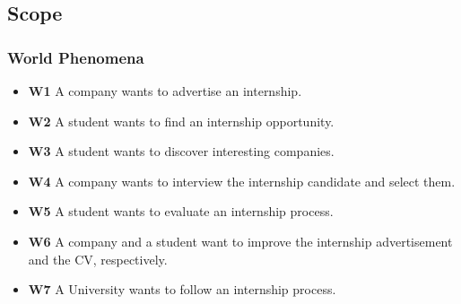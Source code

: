 \documentclass{article}
\begin{document}
\subsection{Scope}
\subsubsection{World Phenomena}
    \begin{itemize}
        \item \textbf{W1} A company wants to advertise an internship. 
        \item \textbf{W2} A student wants to find an internship opportunity.
        \item \textbf{W3} A student wants to discover interesting companies.
        \item \textbf{W4} A company wants to interview the internship candidate and select them.
        \item \textbf{W5} A student wants to evaluate an internship process.
        \item \textbf{W6} A company and a student want to improve the internship advertisement and the CV, respectively.
        \item \textbf{W7} A University wants to follow an internship process.
    \end{itemize}
\end{document}
